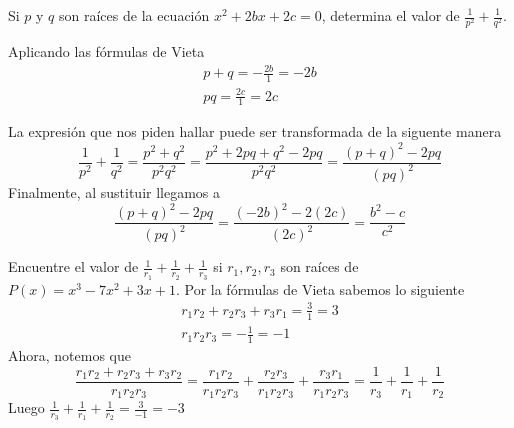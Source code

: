 {    \begin{example}
        Si $p$ y $q$ son raíces de la ecuación $x^2 + 2bx + 2c = 0$, determina el valor de $\frac{1}{p^2} + \frac{1}{q^2}.$

        \solution
        {
            Aplicando las fórmulas de Vieta
            \begin{gather*}
                p + q = - \frac{2b}{1} = - 2b \\
                pq = \frac{2c}{1} = 2c
            \end{gather*}

            La expresión que nos piden hallar puede ser transformada de la siguente manera
            \[\frac{1}{p^2} + \frac{1}{q^2} = \frac{p^2 + q^2}{p^2 q^2} = \frac{p^2 + 2pq + q^2 - 2pq}{p^2 q^2} = \frac{ (p + q)^2 - 2pq}{(pq)^2}\]
            Finalmente, al sustituir llegamos a
            \[\frac{ (p + q)^2 - 2pq}{(pq)^2} = \frac{ (-2b)^2 - 2(2c)}{(2c)^2} = \boxed{\frac{b^2 - c}{c^2}}\]
        }
    \end{example}

    \begin{example}
        Encuentre el valor de $\frac{1}{r_1} + \frac{1}{r_2} + \frac{1}{r_3}$ si $r_1, r_2, r_3$ son raíces de $P(x) = x^3 - 7 x^2 + 3x + 1$.
        \solution
        {
            Por la fórmulas de Vieta sabemos lo siguiente
            \begin{gather*}
                r_1 r_2 + r_2 r_3 + r_3 r_1 = \frac{3}{1} = 3 \\
                r_1 r_2 r_3 = - \frac{1}{1} = -1
            \end{gather*}
            Ahora, notemos que
            \[\frac{r_1 r_2 + r_2 r_3 + r_3 r_2}{r_1 r_2 r_3} = \frac{r_1 r_2}{r_1 r_2 r_3} + \frac{r_2 r_3}{r_1 r_2 r_3} + \frac{r_3 r_1}{r_1 r_2 r_3} = \frac{1}{r_3} + \frac{1}{r_1} + \frac{1}{r_2}\]
            Luego $\frac{1}{r_3} + \frac{1}{r_1} + \frac{1}{r_2} = \frac{3}{-1} = \boxed{-3}$
        }
    \end{example}

}
